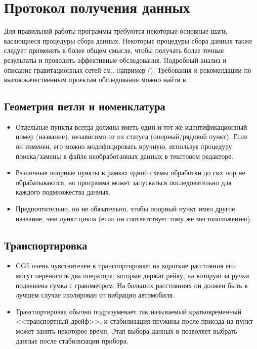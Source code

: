 \chapter[Протокол получения данных]{Протокол получения данных}
\label{chap:acquisition_protocol}

Для правильной работы программы требуются некоторые основные шаги, касающиеся
процедуры сбора данных. Некоторые процедуры сбора данных также следует применять
в более общем смысле, чтобы получать более точные результаты и проводить
эффективные обследования. Подробный анализ и описание гравитационных сетей см.,
например (\cite{lambert_nano_1977, torge_1980}). Требования и рекомендации по
высококачественным проектам обследования можно найти в \cite{seigel_1995}.

\section[Геометрия петли и номенклатура]{Геометрия петли и номенклатура}
\label{sec:loop_geometries_and_nomenclature}

\begin{itemize}
    \item Отдельные пункты всегда должны иметь один и тот же идентификационный
    номер (название), независимо от их статуса (опорный/рядовой
    пункт). Если он изменен, его можно модифицировать вручную, используя процедуру
    поиска/замены в файле необработанных данных в текстовом редакторе.
    
    \item Различные опорные пункты в рамках одной схемы обработки до сих пор не
    обрабатываются, но программа может запускаться последовательно для каждого
    подмножества данных.
    
    \item Предпочтительно, но не обязательно, чтобы опорный пункт имел другое
    название, чем пункт цикла (если он соответствует тому же местоположению).
    
\end{itemize}

\section[Транспортировка]{Транспортировка}
\label{sec:transportation}

\begin{itemize}
    \item CG5 очень чувствителен к транспортировке: на короткие расстояния его
    могут переносить два оператора, которые держат рейку, на которую за ручки
    подвешена сумка с гравиметром. На больших расстояниях он должен быть в
    лучшем случае изолирован от вибрации автомобиля.

    \item Транспортировка обычно подразумевает так называемый кратковременный
    <<транспортный дрейф>>, и стабилизация пружины после приезда на пункт может
    занять некоторое время. Этап выбора данных в \pg{} позволяет выбрать данные
    после стабилизации прибора.

\end{itemize}

